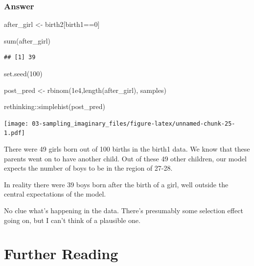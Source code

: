 \documentclass[
]{book}
\newenvironment{Shaded}{\begin{snugshade}}{\end{snugshade}}
\newcommand{\DecValTok}[1]{\textcolor[rgb]{0.00,0.00,0.81}{#1}}
\newcommand{\FloatTok}[1]{\textcolor[rgb]{0.00,0.00,0.81}{#1}}
\newcommand{\FunctionTok}[1]{\textcolor[rgb]{0.00,0.00,0.00}{#1}}
\newcommand{\NormalTok}[1]{#1}
\newcommand{\OtherTok}[1]{\textcolor[rgb]{0.56,0.35,0.01}{#1}}
\newcommand{\SpecialCharTok}[1]{\textcolor[rgb]{0.00,0.00,0.00}{#1}}
\begin{document}
\hypertarget{answer-32}{%
\subsubsection*{Answer}\label{answer-32}}

\begin{Shaded}
\begin{Highlighting}[]
\NormalTok{after\_girl }\OtherTok{\textless{}{-}}\NormalTok{ birth2[birth1}\SpecialCharTok{==}\DecValTok{0}\NormalTok{]}

\FunctionTok{sum}\NormalTok{(after\_girl)}
\end{Highlighting}
\end{Shaded}

\begin{verbatim}
## [1] 39
\end{verbatim}

\begin{Shaded}
\begin{Highlighting}[]
\FunctionTok{set.seed}\NormalTok{(}\DecValTok{100}\NormalTok{)}

\NormalTok{post\_pred }\OtherTok{\textless{}{-}} \FunctionTok{rbinom}\NormalTok{(}\FloatTok{1e4}\NormalTok{,}\FunctionTok{length}\NormalTok{(after\_girl), samples)}

\NormalTok{rethinking}\SpecialCharTok{::}\FunctionTok{simplehist}\NormalTok{(post\_pred)}
\end{Highlighting}
\end{Shaded}

\texttt{[image: 03-sampling\_imaginary\_files/figure-latex/unnamed-chunk-25-1.pdf]}

There were 49 girls born out of 100 births in the birth1 data. We know that these parents went on to have another child. Out of these 49 other children, our model expects the number of boys to be in the region of 27-28.

In reality there were 39 boys born after the birth of a girl, well outside the central expectations of the model.

No clue what's happening in the data. There's presumably some selection effect going on, but I can't think of a plausible one.

\hypertarget{further-reading-2}{%
\section*{Further Reading}\label{further-reading-2}}
\end{document}
